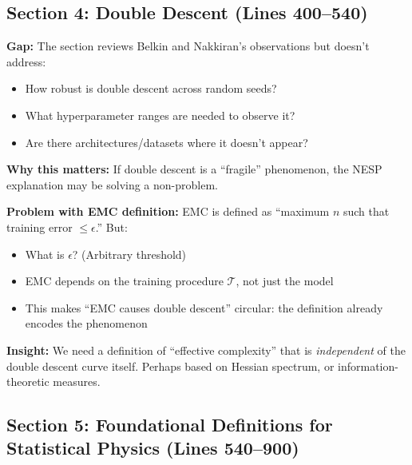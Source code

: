 \documentclass[11pt]{article}
\begin{document}
\subsection{Section 4: Double Descent (Lines 400--540)}

\begin{missingbox}
\textbf{Gap:} The section reviews Belkin and Nakkiran's observations but doesn't address:
\begin{itemize}
    \item How robust is double descent across random seeds?
    \item What hyperparameter ranges are needed to observe it?
    \item Are there architectures/datasets where it doesn't appear?
\end{itemize}

\textbf{Why this matters:} If double descent is a ``fragile'' phenomenon, the NESP explanation may be solving a non-problem.
\end{missingbox}

\begin{vuongmacbox}
\textbf{Problem with EMC definition:} EMC is defined as ``maximum $n$ such that training error $\leq \epsilon$.'' But:
\begin{itemize}
    \item What is $\epsilon$? (Arbitrary threshold)
    \item EMC depends on the training procedure $\mathcal{T}$, not just the model
    \item This makes ``EMC causes double descent'' circular: the definition already encodes the phenomenon
\end{itemize}

\textbf{Insight:} We need a definition of ``effective complexity'' that is \emph{independent} of the double descent curve itself. Perhaps based on Hessian spectrum, or information-theoretic measures.
\end{vuongmacbox}

\subsection{Section 5: Foundational Definitions for Statistical Physics (Lines 540--900)}
\end{document}
